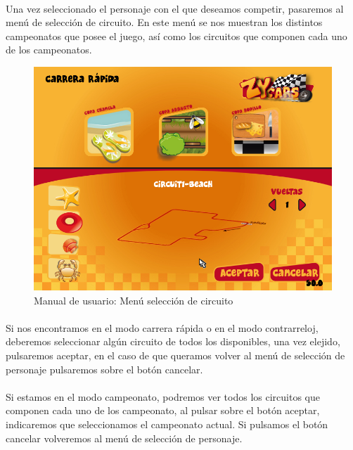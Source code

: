 \paragraph{}
Una vez seleccionado el personaje con el que deseamos competir, pasaremos al menú de selección de circuito. En este menú
se nos muestran los distintos campeonatos que posee el juego, así como los circuitos que componen cada uno de los 
campeonatos. 

\begin{figure}[H]
  \label{menu_circuito}
  \begin{center}
    \includegraphics[scale=0.4]{imagenes/capturas/menucircuito.png}
  \end{center}
 \caption{Manual de usuario: Menú selección de circuito}
\end{figure}

\paragraph{}
Si nos encontramos en el modo carrera rápida o en el modo contrarreloj, deberemos seleccionar algún circuito de todos los
disponibles, una vez elejido, pulsaremos aceptar, en el caso de que queramos volver al menú de selección de personaje
pulsaremos sobre el botón cancelar.

\paragraph{}
Si estamos en el modo campeonato, podremos ver todos los circuitos que componen cada uno de los campeonato, al pulsar sobre
el botón aceptar, indicaremos que seleccionamos el campeonato actual. Si pulsamos el botón cancelar volveremos al menú de selección
de personaje.

